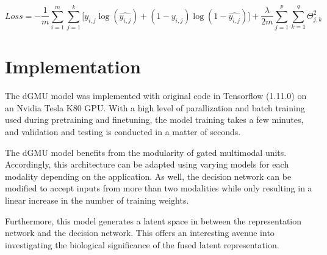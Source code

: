 \begin{equation}
    Loss = - \frac{1}{m}\sum_{i = 1}^{m}\sum_{j = 1}^{k} \lbrack y_{i,j} \log(\hat{y_{i,j}}) + (1 - y_{i,j})\log(1 - \hat{y_{i,j}}) \rbrack + \frac{\lambda}{2m} \sum_{j = 1}^{p}\sum_{k = 1}^{q}\Theta^{2}_{j,k}
\end{equation}

\section{Implementation}

The dGMU model was implemented with original code in Tensorflow (1.11.0) on an Nvidia Tesla K80 GPU. With a high level of parallization and batch training used during pretraining and finetuning, the model training takes a few minutes, and validation and testing is conducted in a matter of seconds.

The dGMU model benefits from the modularity of gated multimodal units. Accordingly, this architecture can be adapted using varying models for each modality depending on the application. As well, the decision network can be modified to accept inputs from more than two modalities while only resulting in a linear increase in the number of training weights.

Furthermore, this model generates a latent space in between the representation network and the decision network. This offers an interesting avenue into investigating the biological significance of the fused latent representation. 